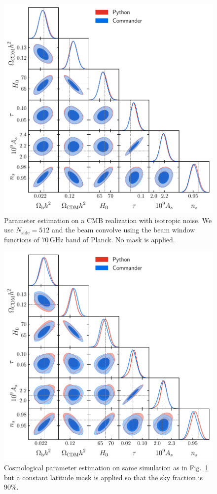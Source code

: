 \documentclass[twocolumn]{../common/aa}
\begin{document}
\begin{figure}
	\centering
	\includegraphics[width=\linewidth]{figures/dist_posterior_no_mask.pdf}
	\caption{\label{fig:nomask}Parameter estimation on a CMB realization with isotropic noise. We use $N_{\mathrm{side}}=512$ and the beam convolve using the beam window functions of 70\,GHz band of Planck. No mask is applied.}
\end{figure}
\begin{figure}
	\centering
	\includegraphics[width=\linewidth]{figures/dist_posterior_10_mask.pdf}
	\caption{Cosmological parameter estimation on same simulation as in Fig.~\ref{fig:nomask} but a constant latitude mask is applied so that the sky fraction is 90\%.}
\end{figure}
\end{document}
